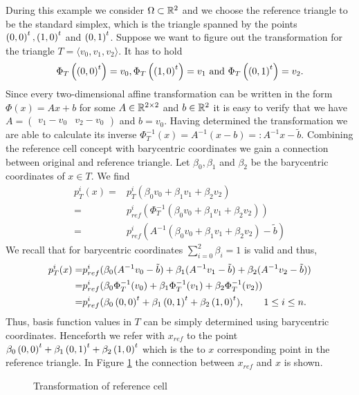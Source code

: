 \begin{example}\label{ex: base cell trafo}
During this example we consider $\Omega \subset \mathbb{R}^2$ and we choose the reference triangle to be the standard simplex, which is the triangle spanned by the points $\left( 0, 0\right)^t, \left( 1, 0\right)^t$ and $\left( 0, 1\right)^t$.
Suppose we want to figure out the transformation for the triangle $T = \langle v_0,v_1,v_2 \rangle$.
It has to hold
\[
\Phi_T\left(\left( 0, 0\right)^t\right) = v_0, \Phi_T\left(\left( 1, 0\right)^t \right) = v_1 \textnormal{ and } \Phi_T\left(\left( 0, 1\right)^t\right) = v_2.
\]
Since every two-dimensional affine transformation can be written in the form $\Phi(x) = Ax+b$ for some $A \in \mathbb{R}^{2 \times 2}$ and $b \in \mathbb{R}^2$ it is easy to verify that we have $A = \begin{pmatrix} v_1-v_0 & v_2-v_0\end{pmatrix}$ and $b = v_0$.
Having determined the transformation we are able to calculate its inverse $\Phi_T^{-1}(x) = A^{-1} (x-b) =: A^{-1} x- \tilde b$.
Combining the reference cell concept with barycentric coordinates we gain a connection between original and reference triangle. Let $\beta_0, \beta_1$ and $\beta_2$ be the barycentric coordinates of $x \in T$. We find
\begin{align*}
	p^i_T(x) =& p_T^i( \beta_0 v_0 +\beta_1 v_1 + \beta_2 v_2  ) \\
	=& p^i_{ref}(\Phi_T^{-1}(\beta_0 v_0 +\beta_1 v_1 + \beta_2 v_2)) \\
	=& p^i_{ref}(A^{-1}(\beta_0 v_0 +\beta_1 v_1 + \beta_2 v_2)- \tilde b)
\end{align*}
We recall that for barycentric coordinates $\sum_{i=0}^2 \beta_i = 1$ is valid and thus,
\begin{align*}
	p^i_T(x)
	=& p^i_{ref}(\beta_0(A^{-1}v_0 -\tilde b) +\beta_1(A^{-1}v_1 -\tilde b) + \beta_2(A^{-1}v_2 -\tilde b))\\
	=& p^i_{ref}(\beta_0 \Phi_T^{-1}(v_0) +\beta_1 \Phi_T^{-1}(v_1) + \beta_2 \Phi_T^{-1}(v_2)) \\
	=& p^i_{ref}(\beta_0 \left( 0, 0\right)^t +\beta_1 \left( 0, 1\right)^t + \beta_2 \left( 1, 0\right)^t ), \qquad 1 \leq i \leq n.
\end{align*}
Thus, basis function values in $T$ can be simply determined using barycentric coordinates. Henceforth we refer with $x_{ref}$  to the point $\beta_0 \left( 0, 0\right)^t +\beta_1 \left( 0, 1\right)^t + \beta_2 \left( 1, 0\right)^t$ which is the to $x$ corresponding point in the reference triangle. In Figure \ref{fig: transformation} the connection between $x_{ref}$ and $x$ is shown.

\begin{figure}[H]
	
	\caption{Transformation of reference cell}
	 \label{fig: transformation}
\end{figure}


\end{example}
